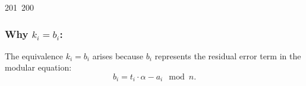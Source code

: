 201~200~\documentclass{article}
\begin{document}
	                                                                        	                                                                    	                                	                    	                    	                        	                        	                    	                                                                	                	                                                                    	                    						\subsubsection*{Why $k_i = b_i$:}
	                                                                        	                                                                    	                                	                    	                    	                        	                        	                    	                                                                	                	                                                                    	                    						The equivalence $k_i = b_i$ arises because $b_i$ represents the residual error term in the modular equation:
	                                                                        	                                                                    	                                	                    	                    	                        	                        	                    	                                                                	                	                                                                    	                    						\[
	                                                                        	                                                                    	                                	                    	                    	                        	                        	                    	                                                                	                	                                                                    	                    							b_i = t_i \cdot \alpha - a_i \mod n.
	                                                                        	                                                                    	                                	                    	                    	                        	                        	                    	                                                                	                	                                                                    	                    							\]
\end{document}
